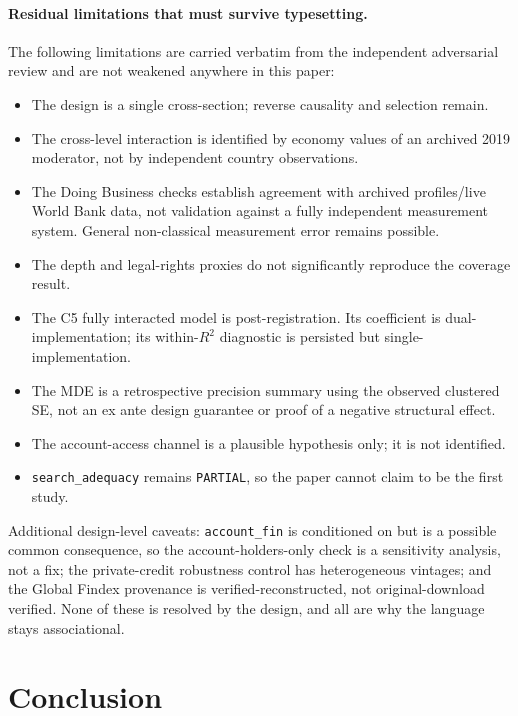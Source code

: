 \paragraph{Residual limitations that must survive typesetting.} The following limitations
are carried verbatim from the independent adversarial review and are not weakened anywhere
in this paper:
\begin{itemize}
\item The design is a single cross-section; reverse causality and selection remain.
\item The cross-level interaction is identified by \NEconomies{} economy values of an
archived 2019 moderator, not by \NAdults{} independent country observations.
\item The Doing Business checks establish agreement with archived profiles/live World Bank
data, not validation against a fully independent measurement system. General non-classical
measurement error remains possible.
\item The depth and legal-rights proxies do not significantly reproduce the coverage result.
\item The C5 fully interacted model is post-registration. Its coefficient is
dual-implementation; its within-$R^2$ diagnostic is persisted but single-implementation.
\item The MDE is a retrospective precision summary using the observed clustered SE, not an
ex ante design guarantee or proof of a negative structural effect.
\item The account-access channel is a plausible hypothesis only; it is not identified.
\item \texttt{search\_adequacy} remains \texttt{PARTIAL}, so the paper cannot claim to be
the first study.
\end{itemize}
Additional design-level caveats: \texttt{account\_fin} is conditioned on but is a possible
common consequence, so the account-holders-only check is a sensitivity analysis, not a fix;
the private-credit robustness control has heterogeneous vintages; and the Global Findex
provenance is verified-reconstructed, not original-download verified. None of these is
resolved by the design, and all are why the language stays associational.

\section{Conclusion}

